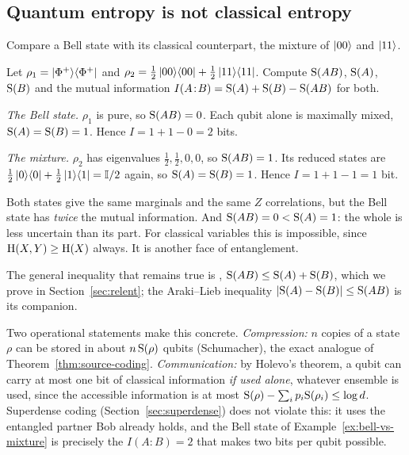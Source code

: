\subsection{Quantum entropy is not classical entropy}

Compare a Bell state with its classical counterpart, the mixture of $\left|00\right\rangle$ and $\left|11\right\rangle$.

\begin{example}\label{ex:bell-vs-mixture}
  Let $\rho_1=\left|\Phi^+\right\rangle\!\left\langle\Phi^+\right|$ and $\rho_2=\tfrac12\left|00\right\rangle\!\left\langle00\right|+\tfrac12\left|11\right\rangle\!\left\langle11\right|$. Compute $\mathrm{S}(AB)$, $\mathrm{S}(A)$, $\mathrm{S}(B)$ and the mutual information $I(A\!:\!B)=\mathrm{S}(A)+\mathrm{S}(B)-\mathrm{S}(AB)$ for both.
\end{example}
\begin{solution}
  \begin{steps}
    \item \emph{The Bell state.} $\rho_1$ is pure, so $\mathrm{S}(AB)=0$. Each qubit alone is maximally mixed, $\mathrm{S}(A)=\mathrm{S}(B)=1$. Hence $I=1+1-0=2$ bits.
    \item \emph{The mixture.} $\rho_2$ has eigenvalues $\tfrac12,\tfrac12,0,0$, so $\mathrm{S}(AB)=1$. Its reduced states are $\tfrac12\left|0\right\rangle\!\left\langle0\right|+\tfrac12\left|1\right\rangle\!\left\langle1\right|=\mathbb{I}/2$ again, so $\mathrm{S}(A)=\mathrm{S}(B)=1$. Hence $I=1+1-1=1$ bit.
  \end{steps}
  Both states give the same marginals and the same $Z$ correlations, but the Bell state has \emph{twice} the mutual information. And $\mathrm{S}(AB)=0<\mathrm{S}(A)=1$: the whole is less uncertain than its part. For classical variables this is impossible, since $\mathrm{H}(X,Y)\ge\mathrm{H}(X)$ always. It is another face of entanglement.
\end{solution}

The general inequality that remains true is , $\mathrm{S}(AB)\le\mathrm{S}(A)+\mathrm{S}(B)$, which we prove in Section~\ref{sec:relent}; the Araki--Lieb inequality $\left|\mathrm{S}(A)-\mathrm{S}(B)\right|\le\mathrm{S}(AB)$ is its companion.

\begin{lookahead}
  Two operational statements make this concrete. \emph{Compression:} $n$ copies of a state $\rho$ can be stored in about $n\,\mathrm{S}(\rho)$ qubits (Schumacher), the exact analogue of Theorem~\ref{thm:source-coding}. \emph{Communication:} by Holevo's theorem, a qubit can carry at most one bit of classical information \emph{if used alone}, whatever ensemble is used, since
  the accessible information is at most $\mathrm{S}(\rho)-\sum_ip_i\mathrm{S}(\rho_i)\le\log d$. Superdense coding (Section~\ref{sec:superdense}) does not violate this: it uses the entangled partner Bob already holds, and the Bell state of Example~\ref{ex:bell-vs-mixture} is precisely the $I(A\!:\!B)=2$ that makes two bits per qubit possible.
\end{lookahead}

